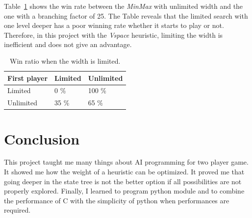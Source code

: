 \documentclass[runningheads]{llncs}
\begin{document}
Table~\ref{tab:win-limit-width} shows the win rate
between the \textit{MinMax} with unlimited width
and the one with a branching factor of 25. The Table
reveals that the limited search with one level
deeper has a poor winning rate whether it starts
to play or not.
Therefore, in this project with the
\textit{Vspace} heuristic, limiting the width is inefficient
and does not give an advantage.
\begin{table}
		\centering
		\caption{Win ratio when the width is limited.}\label{tab:win-limit-width}
		\begin{tabular}{|l|l|l|}
		\hline
		First player &  Limited & Unlimited\\
		\hline
		 Limited &  0 \% & 100 \%\\
		 Unlimited &  35 \% & 65 \%\\
		\hline
		\end{tabular}
\end{table}


\section{Conclusion}
This project taught me many things about AI
programming for two player game. It showed me how
the weight of a heuristic can be optimized. It
proved me that going deeper in the state tree
is not the better option if all possibilities are
not properly explored. Finally, I learned to program python
module and to combine the performance of C with
the simplicity of python when performances are
required.


\end{document}
